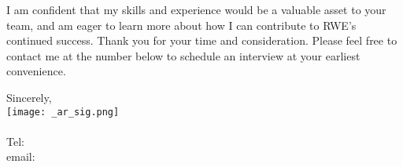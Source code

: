 \documentclass[letterpaper]{article}
\begin{document}
I am confident that my skills and experience would be a valuable asset to your team, and
am eager to learn more about how I can contribute to RWE's continued success.
Thank you for your time and consideration.
Please feel free to contact me at the number below to schedule an interview at your earliest convenience.

Sincerely,\\
    \hspace{1em}
    \texttt{[image: \_ar\_sig.png]} \\
    \CVsigname \\
    \small
    Tel: \CVphone \\
    email: \CVemail
\end{document}
